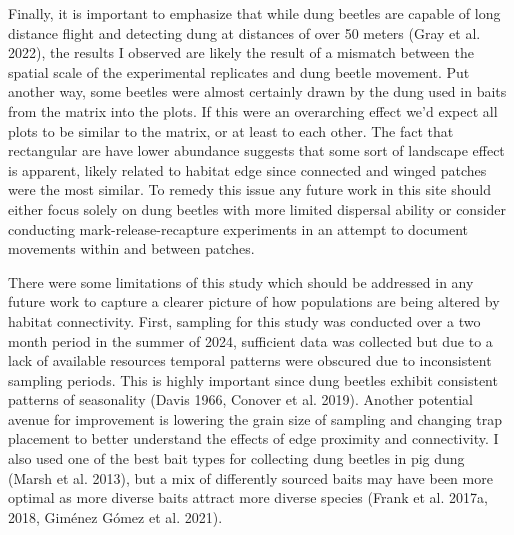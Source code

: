 \documentclass[
  man, donotrepeattitle]{apa6}
\begin{document}
Finally, it is important to emphasize that while dung beetles are capable of long distance flight and detecting dung at distances of over 50 meters (Gray et al. 2022), the results I observed are likely the result of a mismatch between the spatial scale of the experimental replicates and dung beetle movement. Put another way, some beetles were almost certainly drawn by the dung used in baits from the matrix into the plots. If this were an overarching effect we'd expect all plots to be similar to the matrix, or at least to each other. The fact that rectangular are have lower abundance suggests that some sort of landscape effect is apparent, likely related to habitat edge since connected and winged patches were the most similar. To remedy this issue any future work in this site should either focus solely on dung beetles with more limited dispersal ability or consider conducting mark-release-recapture experiments in an attempt to document movements within and between patches.

There were some limitations of this study which should be addressed in any future work to capture a clearer picture of how populations are being altered by habitat connectivity. First, sampling for this study was conducted over a two month period in the summer of 2024, sufficient data was collected but due to a lack of available resources temporal patterns were obscured due to inconsistent sampling periods. This is highly important since dung beetles exhibit consistent patterns of seasonality (Davis 1966, Conover et al. 2019). Another potential avenue for improvement is lowering the grain size of sampling and changing trap placement to better understand the effects of edge proximity and connectivity. I also used one of the best bait types for collecting dung beetles in pig dung (Marsh et al. 2013), but a mix of differently sourced baits may have been more optimal as more diverse baits attract more diverse species (Frank et al. 2017a, 2018, Giménez Gómez et al. 2021).
\end{document}
